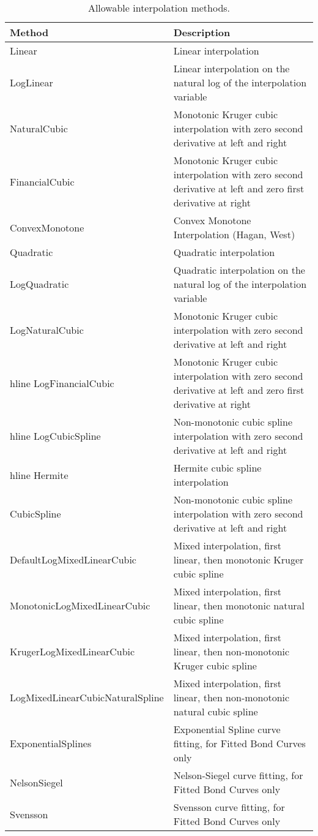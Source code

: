 \begin{table}[h]
\centering
\begin{tabular}{|l|p{11cm}|} 
    \hline
    {\bfseries Method} & {\bfseries Description} \\
    \hline
    Linear & Linear interpolation \\ \hline
    LogLinear & Linear interpolation on the natural log of the interpolation variable \\ \hline
    NaturalCubic & Monotonic Kruger cubic interpolation with zero second derivative at left and right \\ \hline
    FinancialCubic & Monotonic Kruger cubic interpolation with zero second derivative at left and 
                     zero first derivative at right \\ \hline
    ConvexMonotone & Convex Monotone Interpolation (Hagan, West) \\ \hline
    Quadratic & Quadratic interpolation \\ \hline
    LogQuadratic & Quadratic interpolation on the natural log of the interpolation variable \\ \hline
    LogNaturalCubic & Monotonic Kruger cubic interpolation with zero second derivative at left and right \\hline
    LogFinancialCubic & Monotonic Kruger cubic interpolation with zero second derivative at left and 
                     zero first derivative at right \\hline
    LogCubicSpline & Non-monotonic cubic spline interpolation with zero second derivative at left and right \\hline
    Hermite & Hermite cubic spline interpolation \\ \hline
    CubicSpline & Non-monotonic cubic spline interpolation with zero second derivative at left and right \\ \hline
    DefaultLogMixedLinearCubic & Mixed interpolation, first linear, then monotonic Kruger cubic spline \\ \hline
    MonotonicLogMixedLinearCubic & Mixed interpolation, first linear, then monotonic natural cubic spline \\ \hline
    KrugerLogMixedLinearCubic & Mixed interpolation, first linear, then non-monotonic Kruger cubic spline \\ \hline
    LogMixedLinearCubicNaturalSpline & Mixed interpolation, first linear, then non-monotonic natural cubic spline \\ \hline
    ExponentialSplines & Exponential Spline curve fitting, for Fitted Bond Curves only \\ \hline
    NelsonSiegel & Nelson-Siegel curve fitting, for Fitted Bond Curves only \\ \hline
    Svensson & Svensson curve fitting, for Fitted Bond Curves only \\ \hline
  \end{tabular}
  \caption{Allowable interpolation methods.}
  \label{tab:allow_interp_methods}
\end{table}
